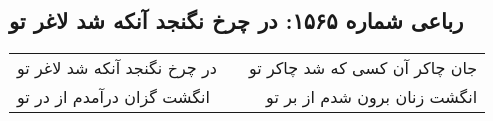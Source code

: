 \begin{center}
\section*{رباعی شماره ۱۵۶۵: در چرخ نگنجد آنکه شد لاغر تو}
\label{sec:1565}
\begin{longtable}{l p{0.5cm} r}
در چرخ نگنجد آنکه شد لاغر تو
&&
جان چاکر آن کسی که شد چاکر تو
\\
انگشت گزان درآمدم از در تو
&&
انگشت زنان برون شدم از بر تو
\\
\end{longtable}
\end{center}
